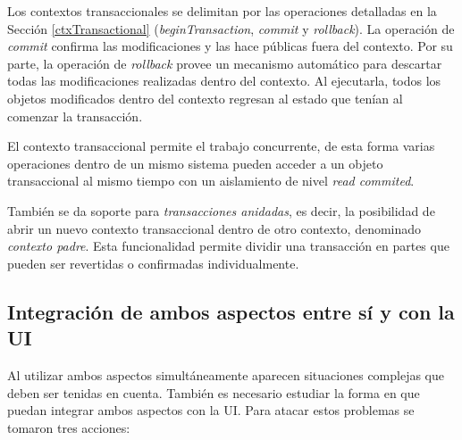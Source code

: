 		Los contextos transaccionales se delimitan por las
		operaciones detalladas en la Sección \ref{ctxTransactional}
		(\emph{beginTransaction}, \emph{commit} y \emph{rollback}).
		La operación de \emph{commit} confirma las modificaciones y las hace públicas
		fuera del contexto.
		Por su parte, la operación de \emph{rollback} provee un
		mecanismo automático para descartar todas las modificaciones realizadas
		dentro del contexto.
		Al ejecutarla, todos los objetos modificados dentro del contexto regresan al
		estado que tenían al comenzar la transacción.
		 
		El contexto transaccional permite el trabajo concurrente, de esta forma
		varias operaciones dentro de un mismo sistema pueden acceder a un objeto transaccional al mismo
		tiempo con un aislamiento de nivel \emph{read commited}.
				 
		También se da soporte para \emph{transacciones anidadas}, es decir, la
		posibilidad de abrir un nuevo contexto transaccional dentro de otro contexto,
		denominado \emph{contexto padre}.
		Esta funcionalidad permite dividir una transacción en partes que pueden ser
		revertidas o confirmadas individualmente.
		
	\subsection{Integración de ambos aspectos entre sí y con la UI}
	\label{sec:Union}
		Al utilizar ambos aspectos simultáneamente aparecen situaciones complejas que
		deben ser tenidas en cuenta. También es necesario estudiar la forma en que
		puedan integrar ambos aspectos con la UI.
		Para atacar estos problemas se tomaron tres acciones:
		
